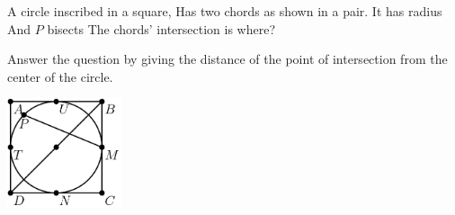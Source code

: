A circle inscribed in a square,
Has two chords as shown in a pair.
It has radius 
And $P$ bisects 
The chords' intersection is where?

Answer the question by giving the distance of the point of intersection from the center of the circle.

\begin{center}
\includegraphics[width = 33.6mm]{img/fig0.png}
\end{center}